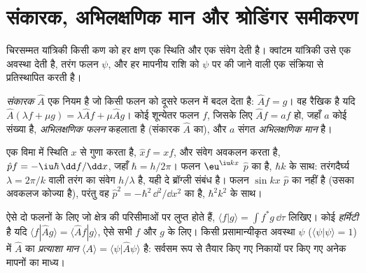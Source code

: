 \section{संकारक, अभिलक्षणिक मान और श्रोडिंगर समीकरण}

चिरसम्मत यांत्रिकी किसी कण को हर क्षण एक स्थिति और एक संवेग देती है। क्वांटम
यांत्रिकी उसे एक अवस्था देती है, तरंग फलन $\psi$, और हर मापनीय राशि को
$\psi$ पर की जाने वाली एक संक्रिया से प्रतिस्थापित करती है।

\begin{definition}[संकारक, अभिलक्षणिक फलन, अभिलक्षणिक मान]\label{def:b3:quantum-model-systems:operator}
\emph{संकारक} $\hat A$ एक नियम है जो किसी फलन को दूसरे फलन में
बदल देता है: $\hat A f = g$। वह रैखिक है यदि $\hat A(\lambda f +
\mu g) = \lambda\hat Af + \mu\hat Ag$। कोई शून्येतर फलन $f$, जिसके लिए
$\hat Af = a f$ हो, जहाँ $a$ कोई संख्या है, \emph{अभिलक्षणिक फलन}
कहलाता है (संकारक $\hat A$ का), और $a$ संगत \emph{अभिलक्षणिक मान} है।
\end{definition}

\begin{example}[स्थिति और संवेग के दो संकारक]\label{ex:b3:quantum-model-systems:xp}
एक विमा में स्थिति  $x$ से गुणा करता है, $\hat x f = xf$,
और संवेग  अवकलन करता है, $\hat p f = -\iu\hbar\,
\dd f/\dd x$, जहाँ $\hbar = h/2\pi$। फलन $\eu^{\iu kx}$
 $\hat p$ का  है,  $\hbar k$ के साथ: तरंगदैर्घ्य
$\lambda = 2\pi/k$ वाली तरंग का संवेग $h/\lambda$ है, यही दे ब्रॉग्ली संबंध है।
फलन $\sin kx$  $\hat p$ का  नहीं है (उसका अवकलज
कोज्या है), परंतु वह $\hat p^2 = -\hbar^2\,\dd^2/\dd x^2$ का  है,
 $\hbar^2k^2$ के साथ।
\end{example}

\begin{definition}[हर्मिटी संकारक, प्रत्याशा मान]\label{def:b3:quantum-model-systems:hermitian}
ऐसे दो फलनों के लिए जो क्षेत्र की परिसीमाओं पर लुप्त होते हैं, $\langle f|g\rangle = \int f^*g\,\dd\tau$
लिखिए। कोई  \emph{हर्मिटी} है
यदि $\langle f|\hat Ag\rangle = \langle \hat Af|g\rangle$, ऐसे सभी
$f$ और $g$ के लिए।
किसी प्रसामान्यीकृत अवस्था $\psi$ ($\langle\psi|\psi\rangle = 1$) में
$\hat A$ का \emph{प्रत्याशा मान}
$\langle A\rangle = \langle\psi|\hat A\psi\rangle$ है: सर्वसम रूप से तैयार किए गए
निकायों पर किए गए अनेक मापनों का माध्य।
\end{definition}

